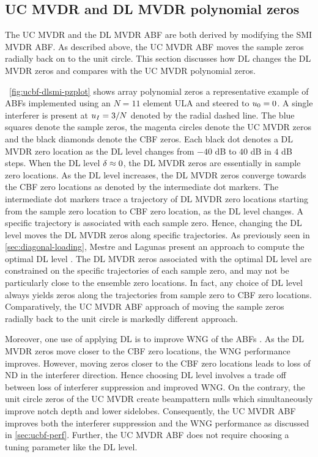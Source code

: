 \subsection{UC MVDR and DL MVDR polynomial zeros}
\label{sec:ucmvdr-dlmvdr}
The UC MVDR and the DL MVDR ABF are both derived by modifying the SMI
MVDR ABF. As described above, the UC MVDR ABF moves the sample zeros
radially back on to the unit circle. This section discusses how DL
changes the DL MVDR zeros and compares with the UC MVDR polynomial
zeros.

\figurename{}~\ref{fig:ucbf-dlsmi-pzplot} shows array polynomial zeros
a representative example of ABFs implemented using an $N = 11$ element
ULA and steered to $u_0 = 0$. A single interferer is present at
$u_I = 3/N$ denoted by the radial dashed line. The blue squares
denote the sample zeros, the magenta circles denote the UC MVDR zeros
and the black diamonds denote the CBF zeros. Each black dot denotes a
DL MVDR zero location as the DL level changes from $-40$ dB to $40$ dB
in $4$ dB steps. When the DL level $\delta \approx 0$, the DL MVDR zeros
are essentially in sample zero locations. As the DL level increases,
the DL MVDR zeros converge towards the CBF zero locations as denoted
by the intermediate dot markers. The intermediate dot markers trace a
trajectory of DL MVDR zero locations starting from the sample zero
location to CBF zero location, as the DL level changes. A specific
trajectory is associated with each sample zero. Hence, changing the DL
level moves the DL MVDR zeros along specific trajectories. As
previously seen in \sect{}\ref{sec:diagonal-loading}, Mestre and
Lagunas present an approach to compute the optimal DL level
\cite{mestre2006finite}. The DL MVDR zeros associated with the optimal
DL level are constrained on the specific trajectories of each sample
zero, and may not be particularly close to the ensemble zero
locations. In fact, any choice of DL level always yields zeros along
the trajectories from sample zero to CBF zero
locations. Comparatively, the UC MVDR ABF approach of moving the
sample zeros radially back to the unit circle is markedly different
approach.

Moreover, one use of applying DL is to improve WNG of the ABFs
\cite{vtree2002oap}. As the DL MVDR zeros move closer to the CBF zero
locations, the WNG performance improves. However, moving zeros closer
to the CBF zero locations leads to loss of ND in the interferer
direction. Hence choosing DL level involves a trade off between loss of
interferer suppression and improved WNG. On the contrary, the unit
circle zeros of the UC MVDR create beampattern nulls which
simultaneously improve notch depth and lower sidelobes. Consequently,
the UC MVDR ABF improves both the interferer suppression and the WNG
performance as discussed in \sect{}\ref{sec:ucbf-perf}. Further, the
UC MVDR ABF does not require choosing a tuning parameter like the DL
level.

